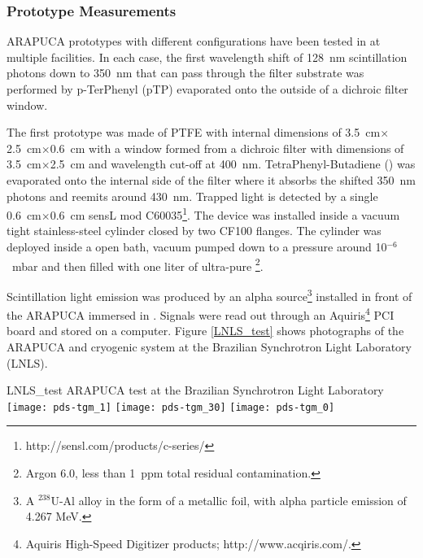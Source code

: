 \subsubsection{Prototype Measurements}
\label{subsec:testlnls}

ARAPUCA prototypes with different configurations have been tested in \lar at multiple facilities. In each case, the first wavelength shift of \SI{128}{nm} scintillation photons down to \SI{350}{nm} that can pass through the filter substrate was performed by p-TerPhenyl (pTP) evaporated onto the outside of a dichroic filter window. 

The first prototype was made of PTFE with internal dimensions of \SI{3.5}{cm}$\times$\SI{2.5}{cm}$\times$\SI{0.6}{cm} with a window formed from a dichroic filter with dimensions of \SI{3.5}{cm}$\times$\SI{2.5}{cm} and wavelength cut-off at \SI{400}{nm}. 
TetraPhenyl-Butadiene () was evaporated onto the internal side of the filter where it absorbs the shifted \SI{350}{nm} photons and reemits around \SI{430}{nm}. Trapped light is detected by a single \SI{0.6}{cm}$\times$\SI{0.6}{cm} sensL  mod C60035\footnote{http://sensl.com/products/c-series/}.
The device was installed inside a vacuum tight stainless-steel cylinder closed by two CF100 flanges. The cylinder was deployed inside a \lar open bath, vacuum pumped down to a pressure around  10$^{-6}$~\si{mbar} and then filled with one liter of ultra-pure \lar\footnote{Argon 6.0, less than \SI{1}{ppm} total residual contamination.}.

Scintillation light emission was produced by an alpha source\footnote{A $^{238}$U-Al alloy in the form of a metallic foil, with alpha particle emission of 4.267 MeV.} installed in front of the ARAPUCA immersed in \lar. Signals were read out through an Aquiris\footnote{Aquiris High-Speed Digitizer products; http://www.acqiris.com/.} PCI board and stored on a computer.
Figure \ref{LNLS_test} shows photographs of the ARAPUCA and cryogenic system 
at the Brazilian Synchrotron Light Laboratory (LNLS). 

\begin{dunefigure}{LNLS_test}
{ARAPUCA test at the Brazilian Synchrotron Light Laboratory} 
	\texttt{[image: pds-tgm\_1]} \quad
	\texttt{[image: pds-tgm\_30]}\quad
	\texttt{[image: pds-tgm\_0]}
\end{dunefigure}


